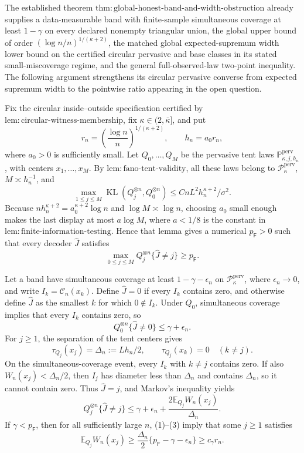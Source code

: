 The established theorem \(\mathrm{thm:global\text{-}honest\text{-}band\text{-}and\text{-}width\text{-}obstruction}\) already supplies a data-measurable band with finite-sample simultaneous coverage at least \(1-\gamma\) on every declared nonempty triangular union, the global upper bound of order \((\log n/n)^{1/(\kappa+2)}\), the matched global expected-supremum width lower bound on the certified circular pervasive and base classes in its stated small-miscoverage regime, and the general full-observed-law two-point inequality.  The following argument strengthens its circular pervasive converse from expected supremum width to the pointwise ratio appearing in the open question.

Fix the circular inside--outside specification certified by \(\mathrm{lem:circular\text{-}witness\text{-}membership}\), fix \(\kappa\in(2,\overline\kappa]\), and put
\[
 r_n=\left(\frac{\log n}{n}\right)^{1/(\kappa+2)},
 \qquad h_n=a_0r_n,
\]
where \(a_0>0\) is sufficiently small.  Let \(Q_0,\ldots,Q_M\) be the pervasive tent laws \(\mathbb P_{\kappa,j,h_n}^{\mathrm{perv}}\), with centers \(x_1,\ldots,x_M\).  By \(\mathrm{lem:fano\text{-}tent\text{-}validity}\), all these laws belong to \(\mathcal P_{\kappa}^{\mathrm{perv}}\), \(M\asymp h_n^{-1}\), and
\[
 \max_{1\le j\le M}
 \operatorname{KL}(Q_j^{\otimes n},Q_0^{\otimes n})
 \le CnL^2h_n^{\kappa+2}/\sigma^2.
\]
Because \(nh_n^{\kappa+2}=a_0^{\kappa+2}\log n\) and \(\log M\asymp\log n\), choosing \(a_0\) small enough makes the last display at most \(a\log M\), where \(a<1/8\) is the constant in \(\mathrm{lem:finite\text{-}information\text{-}testing}\).  Hence that lemma gives a numerical \(p_{\mathsf F}>0\) such that every decoder \(\widehat J\) satisfies
\[
 \max_{0\le j\le M}Q_j^{\otimes n}\{\widehat J\ne j\}
 \ge p_{\mathsf F}. \tag{1}
\]

Let a band have simultaneous coverage at least \(1-\gamma-\epsilon_n\) on \(\mathcal P_{\kappa}^{\mathrm{perv}}\), where \(\epsilon_n\to0\), and write \(I_k=\mathcal C_n(x_k)\).  Define \(\widehat J=0\) if every \(I_k\) contains zero, and otherwise define \(\widehat J\) as the smallest \(k\) for which \(0\notin I_k\).  Under \(Q_0\), simultaneous coverage implies that every \(I_k\) contains zero, so
\[
 Q_0^{\otimes n}\{\widehat J\ne0\}\le\gamma+\epsilon_n. \tag{2}
\]
For \(j\ge1\), the separation of the tent centers gives
\[
 \tau_{Q_j}(x_j)=\Delta_n:=Lh_n/2,
 \qquad \tau_{Q_j}(x_k)=0\quad(k\ne j).
\]
On the simultaneous-coverage event, every \(I_k\) with \(k\ne j\) contains zero.  If also \(W_n(x_j)<\Delta_n/2\), then \(I_j\) has diameter less than \(\Delta_n\) and contains \(\Delta_n\), so it cannot contain zero.  Thus \(\widehat J=j\), and Markov's inequality yields
\[
 Q_j^{\otimes n}\{\widehat J\ne j\}
 \le \gamma+\epsilon_n+
 \frac{2\mathbb E_{Q_j}W_n(x_j)}{\Delta_n}. \tag{3}
\]
If \(\gamma<p_{\mathsf F}\), then for all sufficiently large \(n\), (1)--(3) imply that some \(j\ge1\) satisfies
\[
 \mathbb E_{Q_j}W_n(x_j)
 \ge \frac{\Delta_n}{2}
 \{p_{\mathsf F}-\gamma-\epsilon_n\}
 \ge c_\gamma r_n. \tag{4}
\]

